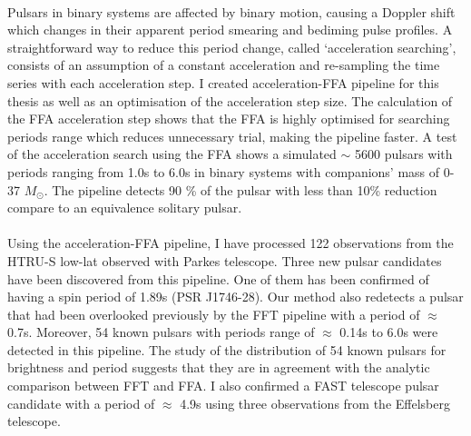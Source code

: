 \documentclass[../chapter1/thesis_msc.tex]{subfiles}
\begin{document}
\paragraph{} Pulsars in binary systems are affected by binary motion, causing a Doppler shift which changes in their apparent period smearing and bediming pulse profiles. 
A straightforward way to reduce this period change, called `acceleration searching', consists of an assumption of a constant acceleration and re-sampling the time series with each acceleration step. I created acceleration-FFA pipeline for this thesis as well as an optimisation of the acceleration step size. The calculation of the FFA acceleration step shows that the FFA is highly optimised for searching periods range which reduces unnecessary trial, making the pipeline faster. A test of the acceleration search using the FFA shows a simulated $\sim$ 5600 pulsars with periods ranging from 1.0s to 6.0s in binary systems with companions' mass of 0-37 $M_\odot$. The pipeline detects  90 \% of the pulsar with less than 10\% reduction  compare to an equivalence solitary pulsar.  

\paragraph{} Using the acceleration-FFA pipeline, I have processed 122 observations from the HTRU-S low-lat observed with Parkes telescope.
Three new pulsar candidates have been discovered from this pipeline. One of them has been confirmed of having a spin period of 1.89s (PSR J1746-28). 
Our method also redetects a pulsar that had been overlooked previously by the FFT pipeline with a period of $\approx$ 0.7s. Moreover, 54 known pulsars with periods range of $\approx$ 0.14s to 6.0s were detected in this pipeline. The study of the distribution of 54 known pulsars for brightness and period suggests that they are in agreement with the analytic comparison between FFT and FFA. I also confirmed a FAST telescope pulsar candidate with a period of $\approx$ 4.9s using three observations from the Effelsberg telescope. 
    
    \clearpage
    \thispagestyle{empty}
\end{document}
